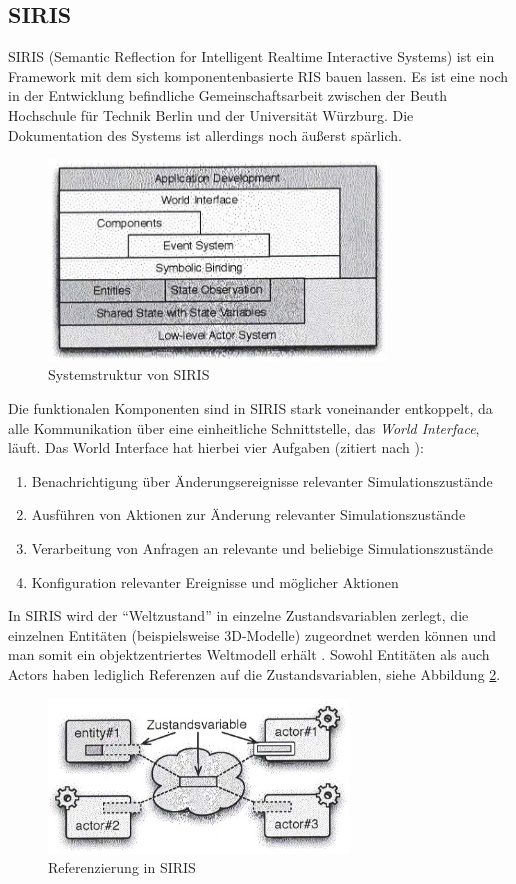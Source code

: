 \subsection{SIRIS}
SIRIS (Semantic Reflection for Intelligent Realtime Interactive Systems) ist ein Framework mit dem sich komponentenbasierte RIS bauen lassen. Es ist eine noch in der Entwicklung befindliche Gemeinschaftsarbeit zwischen der Beuth Hochschule für Technik Berlin und der Universität Würzburg. Die Dokumentation des Systems ist allerdings noch äußerst spärlich.
\begin{figure}
\centering
\includegraphics[width=90mm]{bilder/siris_arch.png}
\caption{Systemstruktur von SIRIS \autocite{SimulatorX}}
\label{fig:sirisarch}
\end{figure}

Die funktionalen Komponenten sind in SIRIS stark voneinander entkoppelt, da alle Kommunikation über eine einheitliche Schnittstelle, das \textit{World Interface}, läuft. Das World Interface hat hierbei vier Aufgaben (zitiert nach \autocite[48]{WorldInterface}):
\begin{enumerate}
    \item Benachrichtigung über Änderungsereignisse relevanter Simulationszustände
    \item Ausführen von Aktionen zur Änderung relevanter Simulationszustände
    \item Verarbeitung von Anfragen an relevante und beliebige Simulationszustände
    \item Konfiguration relevanter Ereignisse und möglicher Aktionen
\end{enumerate}
In SIRIS wird der "`Weltzustand"' in einzelne Zustandsvariablen zerlegt, die einzelnen Entitäten (beispielsweise 3D-Modelle) zugeordnet werden können und man somit ein objektzentriertes Weltmodell erhält \autocite[50]{WorldInterface}. Sowohl Entitäten als auch Actors haben lediglich Referenzen auf die Zustandsvariablen, siehe Abbildung \ref{fig:sirisactors}.
\begin{figure}
\centering
\includegraphics[width=80mm]{bilder/siris_actors.png}
\caption{Referenzierung in SIRIS \autocite{WorldInterface}}
\label{fig:sirisactors}
\end{figure}

